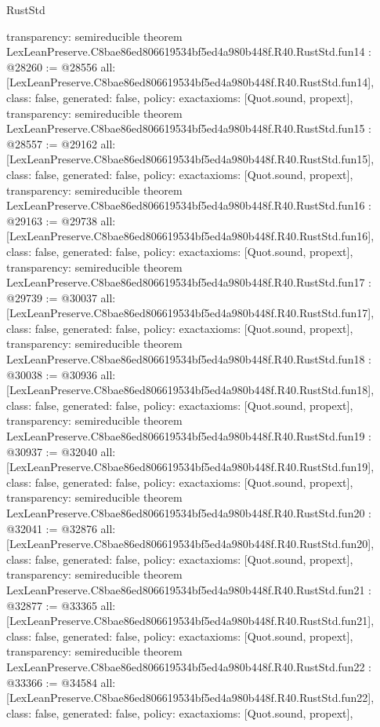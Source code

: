 \begin{lexlean}{RustStd}
\begin{coremodule}
{  transparency: semireducible
}
theorem LexLeanPreserve.C8bae86ed806619534bf5ed4a980b448f.R40.RustStd.fun14 : @28260 := @28556 {
  all: [LexLeanPreserve.C8bae86ed806619534bf5ed4a980b448f.R40.RustStd.fun14],
  class: false,
  generated: false,
  policy: exact{axioms: [Quot.sound, propext]},
  transparency: semireducible
}
theorem LexLeanPreserve.C8bae86ed806619534bf5ed4a980b448f.R40.RustStd.fun15 : @28557 := @29162 {
  all: [LexLeanPreserve.C8bae86ed806619534bf5ed4a980b448f.R40.RustStd.fun15],
  class: false,
  generated: false,
  policy: exact{axioms: [Quot.sound, propext]},
  transparency: semireducible
}
theorem LexLeanPreserve.C8bae86ed806619534bf5ed4a980b448f.R40.RustStd.fun16 : @29163 := @29738 {
  all: [LexLeanPreserve.C8bae86ed806619534bf5ed4a980b448f.R40.RustStd.fun16],
  class: false,
  generated: false,
  policy: exact{axioms: [Quot.sound, propext]},
  transparency: semireducible
}
theorem LexLeanPreserve.C8bae86ed806619534bf5ed4a980b448f.R40.RustStd.fun17 : @29739 := @30037 {
  all: [LexLeanPreserve.C8bae86ed806619534bf5ed4a980b448f.R40.RustStd.fun17],
  class: false,
  generated: false,
  policy: exact{axioms: [Quot.sound, propext]},
  transparency: semireducible
}
theorem LexLeanPreserve.C8bae86ed806619534bf5ed4a980b448f.R40.RustStd.fun18 : @30038 := @30936 {
  all: [LexLeanPreserve.C8bae86ed806619534bf5ed4a980b448f.R40.RustStd.fun18],
  class: false,
  generated: false,
  policy: exact{axioms: [Quot.sound, propext]},
  transparency: semireducible
}
theorem LexLeanPreserve.C8bae86ed806619534bf5ed4a980b448f.R40.RustStd.fun19 : @30937 := @32040 {
  all: [LexLeanPreserve.C8bae86ed806619534bf5ed4a980b448f.R40.RustStd.fun19],
  class: false,
  generated: false,
  policy: exact{axioms: [Quot.sound, propext]},
  transparency: semireducible
}
theorem LexLeanPreserve.C8bae86ed806619534bf5ed4a980b448f.R40.RustStd.fun20 : @32041 := @32876 {
  all: [LexLeanPreserve.C8bae86ed806619534bf5ed4a980b448f.R40.RustStd.fun20],
  class: false,
  generated: false,
  policy: exact{axioms: [Quot.sound, propext]},
  transparency: semireducible
}
theorem LexLeanPreserve.C8bae86ed806619534bf5ed4a980b448f.R40.RustStd.fun21 : @32877 := @33365 {
  all: [LexLeanPreserve.C8bae86ed806619534bf5ed4a980b448f.R40.RustStd.fun21],
  class: false,
  generated: false,
  policy: exact{axioms: [Quot.sound, propext]},
  transparency: semireducible
}
theorem LexLeanPreserve.C8bae86ed806619534bf5ed4a980b448f.R40.RustStd.fun22 : @33366 := @34584 {
  all: [LexLeanPreserve.C8bae86ed806619534bf5ed4a980b448f.R40.RustStd.fun22],
  class: false,
  generated: false,
  policy: exact{axioms: [Quot.sound, propext]},
}
\end{coremodule}
\end{lexlean}
